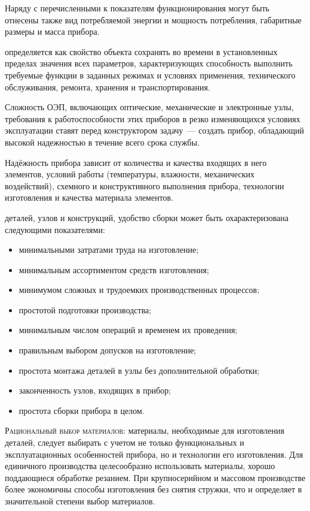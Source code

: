 Наряду с перечисленными к показателям функционирования могут быть отнесены также вид потребляемой энергии и мощность потребления, габаритные размеры и масса прибора.

 определяется как свойство объекта сохранять во времени в установленных пределах значения всех параметров, характеризующих способность выполнить требуемые функции в заданных режимах и условиях применения, технического обслуживания, ремонта, хранения и транспортирования.

Сложность ОЭП, включающих оптические, механические и электронные узлы, требования к работоспособности этих приборов в резко изменяющихся условиях эксплуатации ставят перед конструктором задачу~--- создать прибор, обладающий высокой надежностью в течение всего срока службы.

Надёжность прибора зависит от количества и качества входящих в него элементов, условий работы (температуры, влажности, механических воздействий), схемного и конструктивного выполнения прибора, технологии изготовления и качества материала элементов.

 деталей, узлов и конструкций, удобство сборки может быть охарактеризована следующими показателями: 
\begin{itemize}
	\item минимальными затратами труда на изготовление;
	\item минимальным ассортиментом средств изготовления;
	\item минимумом сложных и трудоемких производственных процессов;
	\item простотой подготовки производства;
	\item минимальным числом операций и временем их проведения;
	\item правильным выбором допусков на изготовление;
	\item простота монтажа деталей в узлы без дополнительной обработки;
	\item законченность узлов, входящих в прибор;
	\item простота сборки прибора в целом.
\end{itemize}

\textsc{Рациональный выбор материалов}: материалы, необходимые для изготовления деталей, следует выбирать с учетом не только функциональных и эксплуатационных особенностей прибора, но и технологии его изготовления. Для единичного производства целесообразно использовать материалы, хорошо поддающиеся обработке резанием. При крупносерийном и массовом производстве более экономичны способы изготовления без снятия стружки, что и определяет в значительной степени выбор материалов.

